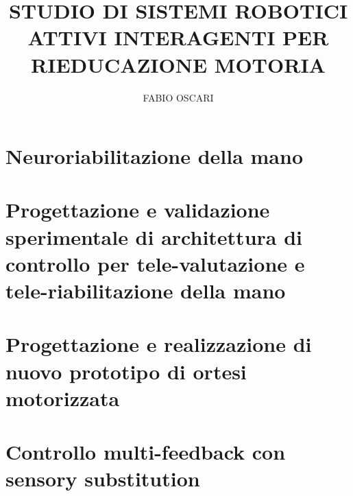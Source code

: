 \documentclass[nocite]{cls/dimeg04}
\begin{document}
\author{FABIO OSCARI}
\title{STUDIO DI SISTEMI ROBOTICI ATTIVI INTERAGENTI PER RIEDUCAZIONE MOTORIA}




\maketitle
\tableofcontents

%
%

\pagestyle{headings}
\setcounter{chapter}{0}\setcounter{section}{0}

\part{Neuroriabilitazione della mano}

%
%
%

\part{Progettazione e validazione sperimentale di architettura di controllo per tele-valutazione e tele-riabilitazione della mano}

%
%

\part{Progettazione e realizzazione di nuovo prototipo di ortesi motorizzata}

\part{Controllo multi-feedback con sensory substitution}

%
%
%
%
%
\end{document}
